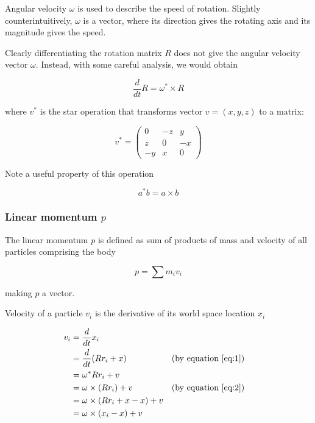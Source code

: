 \documentclass[12pt,a4paper,twoside,openright]{report}
\begin{document}
Angular velocity $\omega$ is used to describe the speed of rotation. Slightly counterintuitively, $\omega$ is a vector, where its direction gives the rotating axis and its magnitude gives the speed.

Clearly differentiating the rotation matrix $R$ does not give the angular velocity vector $\omega$. Instead, with some careful analysis, we would obtain %

\begin{equation}
\frac{d}{dt}R = \omega ^* \times R
\end{equation}

where $v^*$ is the star operation that transforms vector $v=(x, y, z)$ to a matrix:

\begin{equation}
    v^* = \begin{pmatrix}
        0 & -z & y \\
        z & 0 & -x \\
        -y & x & 0
    \end{pmatrix}
\end{equation}

Note a useful property of this operation

\begin{equation}
    a^* b = a \times b\label{eq:2}
\end{equation}

\subsubsection{Linear momentum $p$} 

The linear momentum $p$ is defined as sum of products of mass and velocity of all particles comprising the body

\begin{equation}
    p = \sum m_i v_i
\end{equation}

making $p$ a vector.

Velocity of a particle $v_i$ is the derivative of its world space location $x_i$

\begin{align*}
    v_i &= \frac{d}{dt}x_i \\
        &= \frac{d}{dt}(R r_i + x) && \text{(by equation \eqref{eq:1})} \\
        &= \omega^* R r_i + v \\
        &= \omega \times (R r_i) + v && \text{(by equation \eqref{eq:2})} \\
        &= \omega \times (R r_i + x - x) + v \\
        &= \omega \times (x_i - x) + v
\end{align*}
\end{document}
